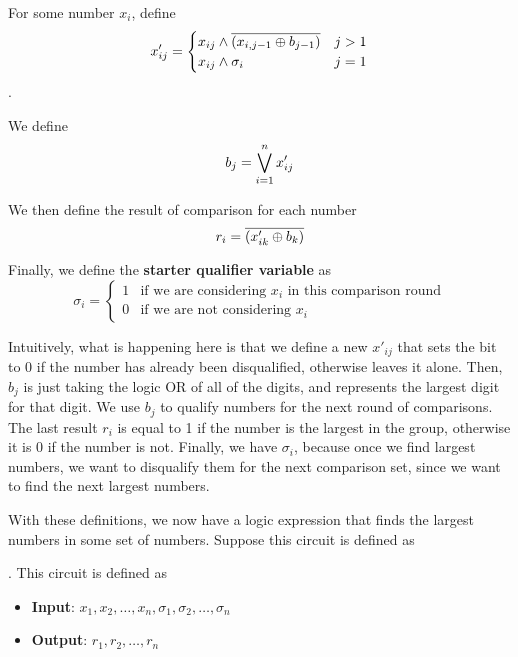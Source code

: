 \documentclass{article}
\begin{document}
\begin{definition}
  For some number $x_i$, define 
  \begin{equation}
    x'_{ij} = \begin{cases}
      x_{ij} \land \overline{\left(
      x_{i, j-1} \oplus b_{j-1}
    \right)} & j > 1 \\
    x_{ij} \land \sigma_i & j = 1
    \end{cases}
  \end{equation}.

  We define 
  \begin{equation}
    b_j = \bigvee_{i=1}^n x'_{ij}
  \end{equation}

  We then define the result of comparison for each number
  \begin{equation}
    r_i = \overline{
      \left(
        x'_{ik} \oplus b_{k}
      \right)
    }
  \end{equation}

  Finally, we define the \textbf{starter qualifier variable} as 
  \begin{equation}
    \sigma_i = \begin{cases}
      1 & \text{if we are considering $x_i$ in this comparison round}\\
      0 & \text{if we are not considering $x_i$}
    \end{cases}
  \end{equation}
\end{definition}

Intuitively, what is happening here is that we define a new $x'_{ij}$ that sets the bit to 0 if the number has already been disqualified, otherwise leaves it alone.
Then, $b_j$ is just taking the logic OR of all of the digits, and represents the largest digit for that digit. We use $b_j$ to qualify numbers for the next round of comparisons.
The last result $r_i$ is equal to 1 if the number is the largest in the group, otherwise it is 0 if the number is not.
Finally, we have $\sigma_i$, because once we find largest numbers, we want to disqualify them for the next comparison set, since we want to find the next largest numbers.

With these definitions, we now have a logic expression that finds the largest numbers in some set of numbers.
Suppose this circuit is defined as 

\begin{definition}
  . This circuit is defined as 
  \begin{itemize}
    \item \textbf{Input}: $x_1, x_2, \dots, x_n, \sigma_1, \sigma_2, \dots, \sigma_n$
    \item \textbf{Output}: $r_1, r_2, \dots, r_n$
  \end{itemize}
\end{definition}
\end{document}
